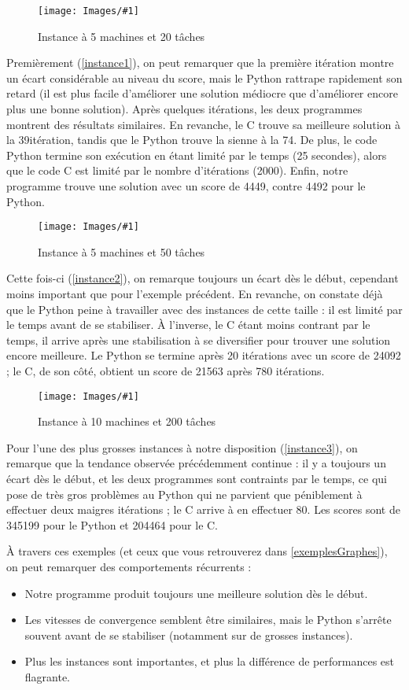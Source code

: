 \documentclass[hideweeklyreports]{polytech/polytech}
\newcommand{\imgr}[4]{%
   \begin{figure}[H]
      \centering
      	\label{#4}
         \texttt{[image: Images/\#1]}
         \caption{#2}
   \end{figure}
}
\begin{document}
			\imgr{5-20-1.png}{Instance à 5 machines et 20 tâches}{0.45}{instance1}
			
			Premièrement (\autoref{instance1}), on peut remarquer que la première itération montre un écart considérable au niveau du score, mais le Python rattrape rapidement son retard (il est plus facile d'améliorer une solution médiocre que d'améliorer encore plus une bonne solution). Après quelques itérations, les deux programmes montrent des résultats similaires. En revanche, le C trouve sa meilleure solution à la 39\ieme itération, tandis que le Python trouve la sienne à la 74\ieme . De plus, le code Python termine son exécution en étant limité par le temps (25 secondes), alors que le code C est limité par le nombre d'itérations (2000). Enfin, notre programme trouve une solution avec un score de 4449, contre 4492 pour le Python.
			
			\imgr{5-50-1.png}{Instance à 5 machines et 50 tâches}{0.45}{instance2}
			
			Cette fois-ci (\autoref{instance2}), on remarque toujours un écart dès le début, cependant moins important que pour l'exemple précédent. En revanche, on constate déjà que le Python peine à travailler avec des instances de cette taille : il est limité par le temps avant de se stabiliser. À l'inverse, le C étant moins contrant par le temps, il arrive après une stabilisation à se diversifier pour trouver une solution encore meilleure. Le Python se termine après 20 itérations avec un score de 24092 ; le C, de son côté, obtient un score de 21563 après 780 itérations.
			
			\imgr{10-200-1.png}{Instance à 10 machines et 200 tâches}{0.45}{instance3}
			
			Pour l'une des plus grosses instances à notre disposition (\autoref{instance3}), on remarque que la tendance observée précédemment continue : il y a toujours un écart dès le début, et les deux programmes sont contraints par le temps, ce qui pose de très gros problèmes au Python qui ne parvient que péniblement à effectuer deux maigres itérations ; le C arrive à en effectuer 80. Les scores sont de 345199 pour le Python et 204464 pour le C.
			
			À travers ces exemples (et ceux que vous retrouverez dans \autoref{exemplesGraphes}), on peut remarquer des comportements récurrents :
			\begin{itemize}
				\item Notre programme produit toujours une meilleure solution dès le début.
				\item Les vitesses de convergence semblent être similaires, mais le Python s'arrête souvent avant de se stabiliser (notamment sur de grosses instances).
				\item Plus les instances sont importantes, et plus la différence de performances est flagrante.
			\end{itemize}
			
\end{document}
